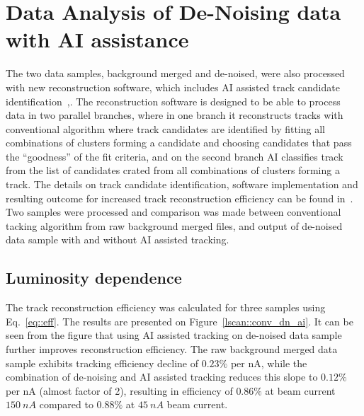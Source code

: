 \section{Data Analysis of De-Noising data with AI assistance}

The two data samples, background merged and de-noised, were also processed with new 
reconstruction software, which includes AI assisted track candidate identification~\cite{Gavalian:2020oxg},\cite{Gavalian:2020xmc}. 
The reconstruction software is designed to be able to process data in two parallel branches, where in one 
branch it reconstructs tracks with conventional algorithm where track candidates are identified by fitting all 
combinations of clusters forming a candidate and choosing candidates that pass the ``goodness'' of the fit criteria, 
 and on the second branch AI classifies track from the list of candidates crated from all combinations of clusters 
 forming a track. 
 The details on track candidate identification, software implementation and resulting outcome for increased 
 track reconstruction efficiency can be found in~\cite{Gavalian:2022hfa}.
 Two samples were processed and comparison was made between conventional tacking algorithm from raw 
 background merged files, and output of de-noised data sample with and without AI assisted tracking. 

\subsection{Luminosity dependence}

The track reconstruction efficiency was calculated for three samples using Eq.~\ref{eq::eff}.
The results are presented on Figure~\ref{lscan::conv_dn_ai}. It can be seen from the figure that using 
AI assisted tracking on de-noised data sample further improves reconstruction efficiency. The raw background 
merged data sample exhibits tracking efficiency decline of $0.23\%$ per nA, while the combination of de-noising 
and AI assisted tracking reduces this slope to $0.12\%$ per nA (almost factor of 2), resulting in efficiency of $0.86\%$ at
 beam current $150~nA$ compared to $0.88\%$ at $45~nA$ beam current. 

